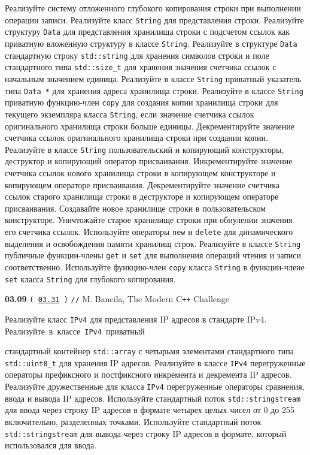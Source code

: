 \documentclass[a4paper,12pt]{article}
\begin{document}
Реализуйте систему отложенного глубокого копирования строки при выполнении операции записи. Реализуйте класс \lstinline{String} для представления строки. Реализуйте структуру \lstinline{Data} для представления хранилища строки с подсчетом ссылок как приватную вложенную структуру в классе \lstinline{String}. Реализуйте в структуре \lstinline{Data} стандартную строку \lstinline{std::string} для хранения символов строки и поле стандартного типа \lstinline{std::size_t} для хранения значения счетчика ссылок с начальным значением единица. Реализуйте в классе \lstinline{String} приватный указатель типа \lstinline{Data *} для хранения адреса хранилища строки. Реализуйте в классе \lstinline{String} приватную функцию-член \lstinline{copy} для создания копии хранилища строки для текущего экземпляра класса \lstinline{String}, если значение счетчика ссылок оригинального хранилища строки больше единицы. Декрементируйте значение счетчика ссылок оригинального хранилища строки при создании копии. Реализуйте в классе \lstinline{String} пользовательский и копирующий конструкторы, деструктор и копирующий оператор присваивания. Инкрементируйте значение счетчика ссылок нового хранилища строки в копирующем конструкторе и копирующем операторе присваивания. Декрементируйте значение счетчика ссылок старого хранилища строки в деструкторе и копирующем операторе присваивания. Создавайте новое хранилище строки в пользовательском конструкторе. Уничтожайте старое хранилище строки при обнулении значения его счетчика ссылок. Используйте операторы \lstinline{new} и \lstinline{delete} для динамического выделения и освобождения памяти хранилищ строк. Реализуйте в классе \lstinline{String} публичные функции-члены \lstinline{get} и \lstinline{set} для выполнения операций чтения и записи соответственно. Используйте функцию-член \lstinline{copy} класса \lstinline{String} в функции-члене \lstinline{set} класса \lstinline{String} для глубокого копирования.
 
\bigskip

{\large \textbf{03.09} \texttt{(\,\href{https://github.com/i-s-m-mipt/Education/blob/master/projects/examples/source/03.31.cpp}{03.31}\,)} \texttt{//} M. Bancila, The Modern C\texttt{++} Challenge}

\bigskip

Реализуйте класс \lstinline{IPv4} для представления IP адресов в стандарте IPv4. Реализуйте~в~классе~\lstinline{IPv4}~приватный 

стандартный контейнер \lstinline{std::array} с четырьмя элементами стандартного типа \lstinline{std::uint8_t} для хранения IP адресов. Реализуйте в классе \lstinline{IPv4} перегруженные операторы префиксного и постфиксного инкремента и декремента IP адресов. Реализуйте дружественные для класса \lstinline{IPv4} перегруженные операторы сравнения, ввода и вывода IP адресов. Используйте стандартный поток \lstinline{std::stringstream} для ввода через строку IP адресов в формате четырех целых чисел от 0 до 255 включительно, разделенных точками. Используйте стандартный поток \lstinline{std::stringstream} для вывода через строку IP адресов в формате, который использовался для ввода.
\end{document}
